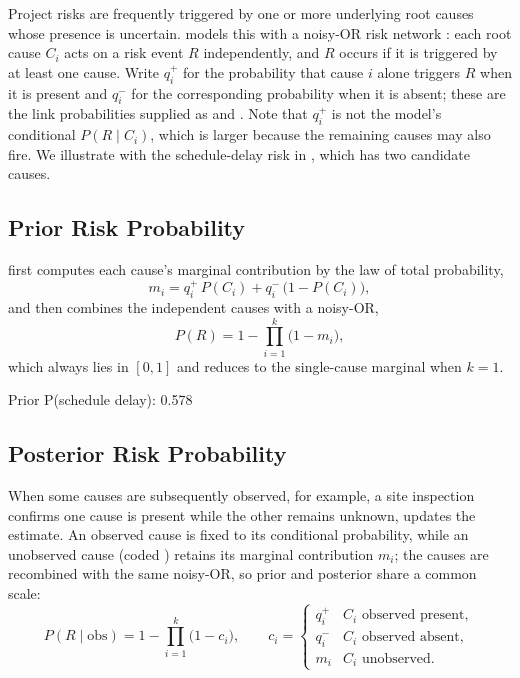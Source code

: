 \documentclass[
]{jss}
\begin{document}
Project risks are frequently triggered by one or more underlying root
causes whose presence is uncertain.  models this with a
noisy-OR risk network \citep{Pearl1988}: each root cause \(C_i\) acts on
a risk event \(R\) independently, and \(R\) occurs if it is triggered by
at least one cause. Write \(q_i^{+}\) for the probability that cause
\(i\) alone triggers \(R\) when it is present and \(q_i^{-}\) for the
corresponding probability when it is absent; these are the link
probabilities supplied as  and
. Note that \(q_i^{+}\) is not the
model's conditional \(P(R \mid C_i)\), which is larger because the
remaining causes may also fire. We illustrate with the schedule-delay
risk in , which has two candidate causes.

\subsection{Prior Risk Probability}\label{prior-risk-probability}

 first computes each cause's marginal contribution by
the law of total probability,
\[m_i = q_i^{+}\,P(C_i) + q_i^{-}\,\bigl(1 - P(C_i)\bigr),\] and then
combines the independent causes with a noisy-OR,
\[P(R) = 1 - \prod_{i=1}^{k}\bigl(1 - m_i\bigr),\] which always lies in
\([0, 1]\) and reduces to the single-cause marginal when \(k = 1\).

\begin{CodeChunk}
\begin{CodeOutput}
Prior P(schedule delay): 0.578 
\end{CodeOutput}
\end{CodeChunk}

\subsection{Posterior Risk
Probability}\label{posterior-risk-probability}

When some causes are subsequently observed, for example, a site
inspection confirms one cause is present while the other remains
unknown,  updates the estimate. An observed
cause is fixed to its conditional probability, while an unobserved cause
(coded ) retains its marginal contribution \(m_i\); the causes
are recombined with the same noisy-OR, so prior and posterior share a
common scale:
\[P(R \mid \text{obs}) = 1 - \prod_{i=1}^{k}\bigl(1 - c_i\bigr), \qquad
  c_i = \begin{cases}
    q_i^{+} & C_i \text{ observed present},\\
    q_i^{-} & C_i \text{ observed absent},\\
    m_i     & C_i \text{ unobserved}.
  \end{cases}\]
\end{document}
